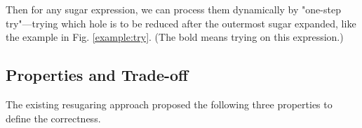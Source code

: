 Then for any sugar expression, we can process them dynamically by "one-step try"---trying which hole is to be reduced after the outermost sugar expanded, like the example in Fig.  \ref{example:try}. (The bold  means trying on this expression.)



\subsection{Properties and Trade-off}
\label{mark:correctness}

The existing resugaring approach proposed the following three properties to define the correctness.

